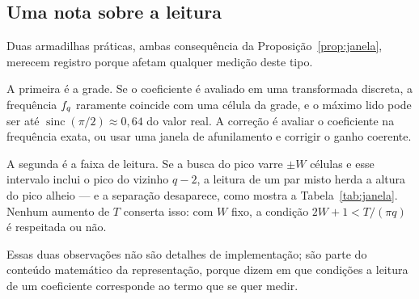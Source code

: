 \subsection{Uma nota sobre a leitura}

Duas armadilhas práticas, ambas consequência da Proposição~\ref{prop:janela},
merecem registro porque afetam qualquer medição deste tipo.

A primeira é a grade. Se o coeficiente é avaliado em uma transformada discreta, a
frequência $f_{q}$ raramente coincide com uma célula da grade, e o máximo lido
pode ser até $\operatorname{sinc}(\pi/2)\approx0{,}64$ do valor real. A correção é
avaliar o coeficiente na frequência exata, ou usar uma janela de afunilamento e
corrigir o ganho coerente.

A segunda é a faixa de leitura. Se a busca do pico varre $\pm W$ células e esse
intervalo inclui o pico do vizinho $q-2$, a leitura de um par misto herda a altura
do pico alheio — e a separação desaparece, como mostra a
Tabela~\ref{tab:janela}. Nenhum aumento de $T$ conserta isso: com $W$ fixo, a
condição $2W+1<T/(\pi q)$ é respeitada ou não.

Essas duas observações não são detalhes de implementação; são parte do conteúdo
matemático da representação, porque dizem em que condições a leitura de um
coeficiente corresponde ao termo que se quer medir.
